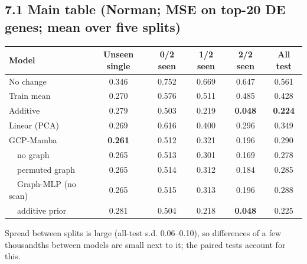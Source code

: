 \documentclass[10.5pt]{article}
\begin{document}
\subsection*{7.1 Main table (Norman; MSE on top-20 DE genes; mean over five splits)}
\begin{center}\small
\begin{tabular}{@{}lccccc@{}}
\toprule
Model & Unseen single & 0/2 seen & 1/2 seen & 2/2 seen & All test\\
\midrule
No change & 0.346 & 0.752 & 0.669 & 0.647 & 0.561\\
Train mean & 0.270 & 0.576 & 0.511 & 0.485 & 0.428\\
Additive & 0.279 & 0.503 & 0.219 & \textbf{0.048} & \textbf{0.224}\\
Linear (PCA) & 0.269 & 0.616 & 0.400 & 0.296 & 0.349\\
\midrule
GCP-Mamba & \textbf{0.261} & 0.512 & 0.321 & 0.196 & 0.290\\
\ \ no graph & 0.265 & 0.513 & 0.301 & 0.169 & 0.278\\
\ \ permuted graph & 0.265 & 0.514 & 0.312 & 0.184 & 0.285\\
\ \ Graph-MLP (no scan) & 0.265 & 0.515 & 0.313 & 0.196 & 0.288\\
\ \ additive prior & 0.281 & 0.504 & 0.218 & \textbf{0.048} & 0.225\\
\bottomrule
\end{tabular}
\end{center}
Spread between splits is large (all-test s.d. 0.06--0.10), so differences of a few thousandths between
models are small next to it; the paired tests account for this.
\end{document}
